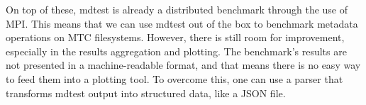 On top of these, mdtest is already a distributed benchmark through the use of MPI. This means that we can use mdtest out of the box to benchmark metadata operations on MTC filesystems. However, there is still room for improvement, especially in the results aggregation and plotting. The benchmark's results are not presented in a machine-readable format, and that means there is no easy way to feed them into a plotting tool. To overcome this, one can use a parser that transforms mdtest output into structured data, like a JSON\cite{json} file.
